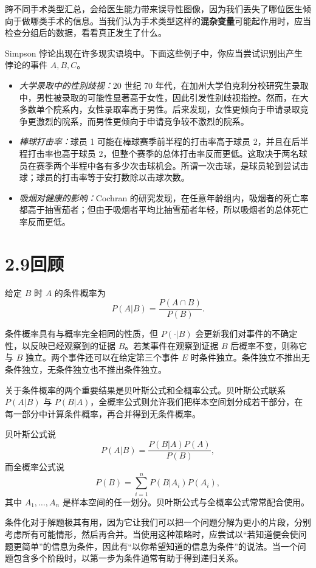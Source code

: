 \documentclass[UTF8,12pt,a4paper,fontset=fandol]{ctexart}
\begin{document}
跨不同手术类型汇总，会给医生能力带来误导性图像，因为我们丢失了哪位医生倾向于做哪类手术的信息。当我们认为手术类型这样的\textbf{混杂变量}可能起作用时，应当检查分组后的数据，看看真正发生了什么。

Simpson 悖论出现在许多现实语境中。下面这些例子中，你应当尝试识别出产生悖论的事件 $A,B,C$。

\begin{itemize}
  \item \textit{大学录取中的性别歧视：}20 世纪 70 年代，在加州大学伯克利分校研究生录取中，男性被录取的可能性显著高于女性，因此引发性别歧视指控。然而，在大多数单个院系内，女性录取率高于男性。后来发现，女性更倾向于申请录取竞争更激烈的院系，而男性更倾向于申请竞争较不激烈的院系。
  \item \textit{棒球打击率：}球员 1 可能在棒球赛季前半程的打击率高于球员 2，并且在后半程打击率也高于球员 2，但整个赛季的总体打击率反而更低。这取决于两名球员在赛季两个半程中各有多少次击球机会。所谓一次击球，是球员轮到尝试击球；球员的打击率等于安打数除以击球次数。
  \item \textit{吸烟对健康的影响：}Cochran 的研究发现，在任意年龄组内，吸烟者的死亡率都高于抽雪茄者；但由于吸烟者平均比抽雪茄者年轻，所以吸烟者的总体死亡率反而更低。
\end{itemize}

\section*{2.9\quad 回顾}

给定 $B$ 时 $A$ 的条件概率为
\[
  P(A|B)=\frac{P(A\cap B)}{P(B)}.
\]

条件概率具有与概率完全相同的性质，但 $P(\cdot|B)$ 会更新我们对事件的不确定性，以反映已经观察到的证据 $B$。若某事件在观察到证据 $B$ 后概率不变，则称它与 $B$ 独立。两个事件还可以在给定第三个事件 $E$ 时条件独立。条件独立不推出无条件独立，无条件独立也不推出条件独立。

关于条件概率的两个重要结果是贝叶斯公式和全概率公式。贝叶斯公式联系 $P(A|B)$ 与 $P(B|A)$，全概率公式则允许我们把样本空间划分成若干部分，在每一部分中计算条件概率，再合并得到无条件概率。

贝叶斯公式说
\[
  P(A|B)=\frac{P(B|A)P(A)}{P(B)},
\]
而全概率公式说
\[
  P(B)=\sum_{i=1}^n P(B|A_i)P(A_i),
\]
其中 $A_1,\ldots,A_n$ 是样本空间的任一划分。贝叶斯公式与全概率公式常常配合使用。

条件化对于解题极其有用，因为它让我们可以把一个问题分解为更小的片段，分别考虑所有可能情形，然后再合并。当使用这种策略时，应尝试以“若知道便会使问题更简单”的信息为条件，因此有“以你希望知道的信息为条件”的说法。当一个问题包含多个阶段时，以第一步为条件通常有助于得到递归关系。
\end{document}
